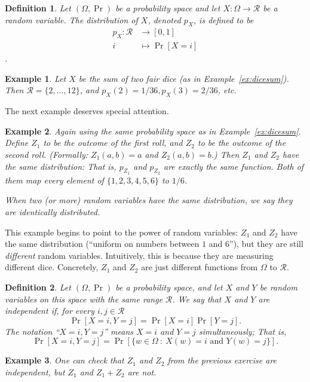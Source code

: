 \documentclass[11pt]{article}
\newtheorem{definition}{Definition}
\newtheorem{example}{Example}
\newcommand{\rvrange}{\mathcal{R}}
\begin{document}
\begin{definition}
    Let $(\Omega,\Pr)$ be a probability space and let $X:\Omega\to\rvrange$
    be a random variable. The \emph{distribution of $X$}, denoted
    $p_X$, is defined to be
    \begin{align*}
        p_X: \rvrange & \to  [0,1] \\
        i & \mapsto  \Pr[X=i]
    \end{align*}.
\end{definition}

\begin{example}
    Let $X$ be the sum of two fair dice (as in Example~\ref{ex:dicesum}).
    Then $\rvrange = \{2,\ldots,12\}$, and $p_X(2)=1/36, p_X(3)=2/36$, etc.
\end{example}

The next example deserves special attention.
\begin{example}
    Again
    using the same probability space as in Example~\ref{ex:dicesum}.
    Define $Z_1$ to be the outcome of the first roll, and $Z_2$ to be
    the outcome of the second roll. (Formally: $Z_1(a,b) = a$ and
    $Z_2(a,b)=b$.)
    Then $Z_1$ and $Z_2$ have the same distribution:
    That is, $p_{Z_1}$ and $p_{Z_2}$ are \emph{exactly the same function}.
    Both of them map every element of $\{1,2,3,4,5,6\}$ to $1/6$.

    When two (or more) random variables have the same distribution, we say
    they are \emph{identically distributed}.
\end{example}
This example begins to point to the power of random variables: $Z_1$ and $Z_2$
have the same distribution (``uniform on numbers between $1$ and $6$''),
but they are still \emph{different} random variables. 
Intuitively, this is
because they are measuring different dice. Concretely, $Z_1$ and $Z_2$ are
just different functions from $\Omega$ to $\rvrange$.

\begin{definition}
    Let $(\Omega,\Pr)$ be a probability space, and let $X$ and $Y$ be
    random variables on this space with the same range $\rvrange$. 
    We say that $X$ and $Y$ are independent
    if, for every $i,j\in\rvrange$
    \[
        \Pr[X=i,Y=j] = \Pr[X=i]\Pr[Y=j].
    \]
    The notation ``$X=i,Y=j$'' means $X=i$ and $Y=j$ simultaneously; That is,
    \[
        \Pr[X=i,Y=j] = \Pr[\{w\in\Omega \ : \ X(w)=i \text{ and } Y(w)=j\}].
    \]
\end{definition}

\begin{example}
    One can check that $Z_1$ and $Z_2$ from the previous exercise are
    independent, but $Z_1$ and $Z_1+Z_2$ are not.
\end{example}
\end{document}
